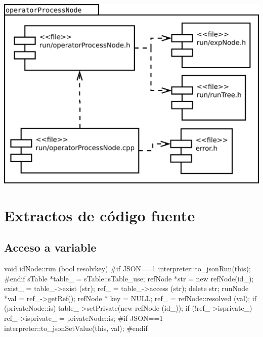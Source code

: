 \begin{center}
\includegraphics[scale=0.3]{files_arquitecture/operatorProcessNode.png} \\
\end{center}

\section{Extractos de código fuente}
\subsection{Acceso a variable}

\begin{myverbatim}
void idNode::run (bool resolvkey) {
   #if JSON==1
      interpreter::to_jsonRun(this);
   #endif
   sTable *table_ = sTable::sTable_use;
   refNode *str = new refNode(id_);
   exist_ = table_->exist (str);
   ref_ = table_->access (str);
   delete str;
   runNode *val = ref_->getRef();
   refNode * key = NULL;
   ref_ = refNode::resolved (val);
   if (privateNode::is)
      table_->setPrivate(new refNode (id_));
   if (!ref_->isprivate_)
      ref_->isprivate_ = privateNode::is;
   #if JSON==1
         interpreter::to_jsonSetValue(this, val);
   #endif
}
\end{myverbatim}


